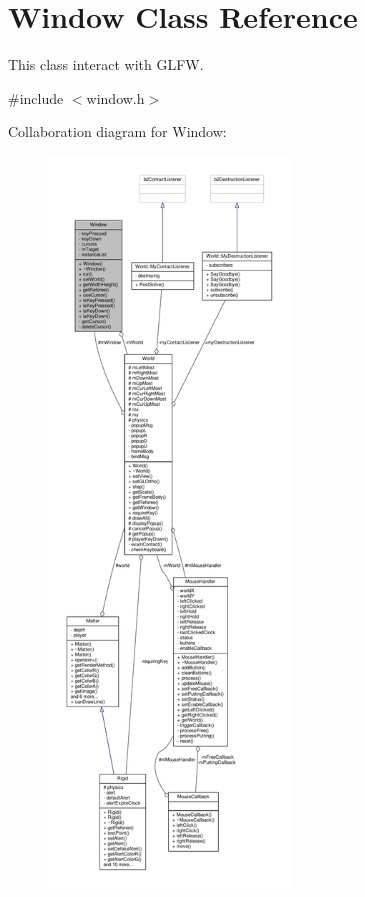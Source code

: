 \hypertarget{classWindow}{}\section{Window Class Reference}
\label{classWindow}


This class interact with G\+L\+F\+W.  




{\ttfamily \#include $<$window.\+h$>$}



Collaboration diagram for Window\+:
\nopagebreak
\begin{figure}[H]
\begin{center}
\leavevmode
\includegraphics[height=550pt]{classWindow__coll__graph}
\end{center}
\end{figure}
